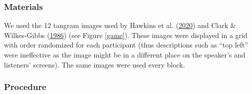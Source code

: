 \documentclass[
  english,
  a4paper,
]{article}
\begin{document}
\hypertarget{materials}{%
\subsubsection{Materials}\label{materials}}

We used the 12 tangram images used by Hawkins et al. (\protect\hyperlink{ref-hawkinsCharacterizingDynamicsLearning2020}{2020}) and Clark \& Wilkes-Gibbs (\protect\hyperlink{ref-clarkReferringCollaborativeProcess1986}{1986}) (see Figure \ref{game}). These images were displayed in a grid with order randomized for each participant (thus descriptions such as ``top left'' were ineffective as the image might be in a different place on the speaker's and listeners' screens). The same images were used every block.

\hypertarget{procedure}{%
\subsubsection{Procedure}\label{procedure}}
\end{document}
